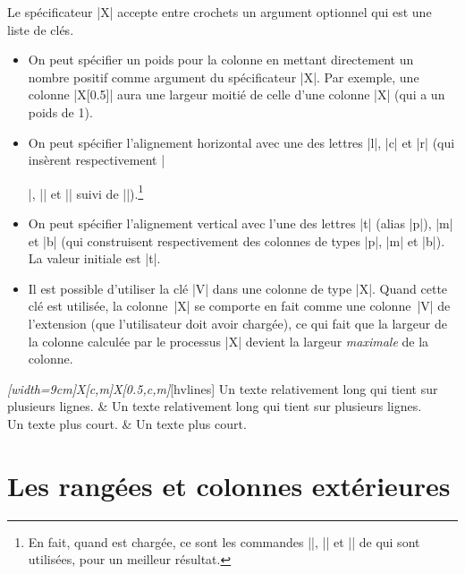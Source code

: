 \documentclass[dvipsnames]{article}
\begin{document}
\medskip
Le spécificateur |X| accepte entre crochets un argument optionnel qui est une
liste de clés.
\begin{itemize}[beginpenalty=10000]
\item On peut spécifier un poids pour la colonne en mettant directement un
nombre positif comme argument du spécificateur |X|. Par exemple, une colonne
|X[0.5]| aura une largeur moitié de celle d'une colonne |X| (qui a un poids de
1).
\item On peut spécifier l'alignement horizontal avec une des lettres |l|, |c| et
|r| (qui insèrent respectivement |\raggedright|, |\centering| et |\raggedleft|
suivi de |\arraybackslash|).\footnote{En fait, quand  est chargée,
ce sont les commandes |\RaggedRight|, |\Centering| et |\RaggedLeft| de
 qui sont utilisées, pour un meilleur résultat.}
\item On peut spécifier l'alignement vertical avec l'une des lettres |t| (alias
|p|), |m| et |b| (qui construisent respectivement des colonnes de types |p|, |m|
et |b|). La valeur initiale est |t|.

\item Il est possible d'utiliser la clé |V| dans une colonne de type |X|. Quand
cette clé est utilisée, la colonne~|X| se comporte en fait comme une colonne~|V|
de l'extension  (que l'utilisateur doit avoir chargée), ce qui
fait que la largeur de la colonne calculée par le processus |X| devient la
largeur \emph{maximale} de la colonne.
\end{itemize}

\begin{Code}
\begin{NiceTabular}\emph{[width=9cm]{X[c,m]X[0.5,c,m]}}[hvlines]
  Un texte relativement long qui tient sur plusieurs lignes. &
  Un texte relativement long qui tient sur plusieurs lignes. \\
  Un texte plus court. & Un texte plus court.
\end{NiceTabular}
\end{Code}






\medskip
\section{Les rangées et colonnes extérieures}

\end{document}
